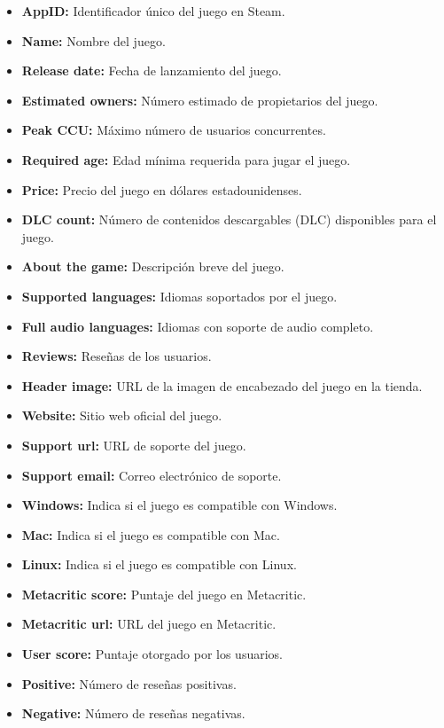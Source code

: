 \documentclass[
  letterpaper,
  DIV=11,
  numbers=noendperiod]{scrreprt}
\providecommand{\tightlist}{%
  \setlength{\itemsep}{0pt}\setlength{\parskip}{0pt}}\usepackage{longtable,booktabs,array}
\begin{document}
\begin{itemize}
\tightlist
\item
  \textbf{AppID:} Identificador único del juego en Steam.
\item
  \textbf{Name:} Nombre del juego.
\item
  \textbf{Release date:} Fecha de lanzamiento del juego.
\item
  \textbf{Estimated owners:} Número estimado de propietarios del juego.
\item
  \textbf{Peak CCU:} Máximo número de usuarios concurrentes.
\item
  \textbf{Required age:} Edad mínima requerida para jugar el juego.
\item
  \textbf{Price:} Precio del juego en dólares estadounidenses.
\item
  \textbf{DLC count:} Número de contenidos descargables (DLC)
  disponibles para el juego.
\item
  \textbf{About the game:} Descripción breve del juego.
\item
  \textbf{Supported languages:} Idiomas soportados por el juego.
\item
  \textbf{Full audio languages:} Idiomas con soporte de audio completo.
\item
  \textbf{Reviews:} Reseñas de los usuarios.
\item
  \textbf{Header image:} URL de la imagen de encabezado del juego en la
  tienda.
\item
  \textbf{Website:} Sitio web oficial del juego.
\item
  \textbf{Support url:} URL de soporte del juego.
\item
  \textbf{Support email:} Correo electrónico de soporte.
\item
  \textbf{Windows:} Indica si el juego es compatible con Windows.
\item
  \textbf{Mac:} Indica si el juego es compatible con Mac.
\item
  \textbf{Linux:} Indica si el juego es compatible con Linux.
\item
  \textbf{Metacritic score:} Puntaje del juego en Metacritic.
\item
  \textbf{Metacritic url:} URL del juego en Metacritic.
\item
  \textbf{User score:} Puntaje otorgado por los usuarios.
\item
  \textbf{Positive:} Número de reseñas positivas.
\item
  \textbf{Negative:} Número de reseñas negativas.

\end{itemize}
\end{document}
